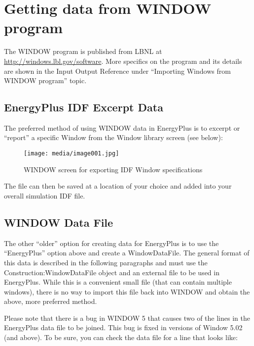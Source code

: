 \section{Getting data from WINDOW program}\label{getting-data-from-window-program}

The WINDOW program is published from LBNL at \url{http://windows.lbl.gov/software}. More specifics on the program and its details are shown in the Input Output Reference under ``Importing Windows from WINDOW program'' topic.

\subsection{EnergyPlus IDF Excerpt Data}\label{energyplus-idf-excerpt-data}

The preferred method of using WINDOW data in EnergyPlus is to excerpt or ``report'' a specific Window from the Window library screen (see below):

\begin{figure}[hbtp] %
\centering
\texttt{[image: media/image001.jpg]}
\caption{WINDOW screen for exporting IDF Window specifications \protect \label{fig:window-screen-for-exporting-idf-window}}
\end{figure}

The file can then be saved at a location of your choice and added into your overall simulation IDF file.

\subsection{WINDOW Data File}\label{window-data-file}

The other ``older'' option for creating data for EnergyPlus is to use the ``EnergyPlus'' option above and create a WindowDataFile. The general format of this data is described in the following paragraphs and must use the Construction:WindowDataFile object and an external file to be used in EnergyPlus. While this is a convenient small file (that can contain multiple windows), there is no way to import this file back into WINDOW and obtain the above, more preferred method.

Please note that there is a bug in WINDOW 5 that causes two of the lines in the EnergyPlus data file to be joined. This bug is fixed in versions of Window 5.02 (and above). To be sure, you can check the data file for a line that looks like:

